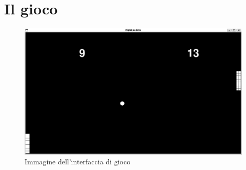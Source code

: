 
\newpage
\section{Il gioco}\label{sec:gioco}

\begin{figure}
    \centering
    \includegraphics[scale=0.4]{img/gioco}
    \caption{Immagine dell'interfaccia di gioco}
    \label{fig:gioco}
\end{figure}

